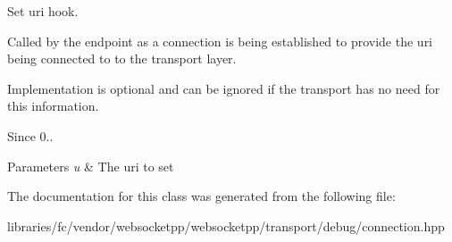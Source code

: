 Set uri hook. 

Called by the endpoint as a connection is being established to provide the uri being connected to to the transport layer.

Implementation is optional and can be ignored if the transport has no need for this information.

\begin{DoxySince}{Since}
0..
\end{DoxySince}

\begin{DoxyParams}{Parameters}
{\em u} & The uri to set \\
\hline
\end{DoxyParams}


The documentation for this class was generated from the following file\+:\begin{DoxyCompactItemize}
\item 
libraries/fc/vendor/websocketpp/websocketpp/transport/debug/connection.\+hpp\end{DoxyCompactItemize}
